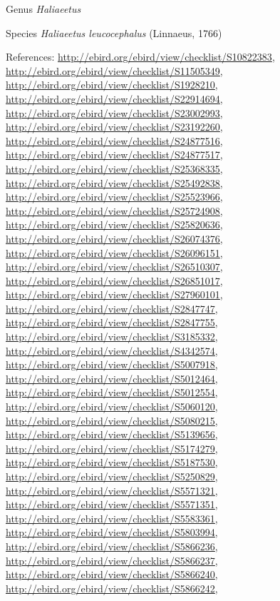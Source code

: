 \documentclass[9pt, article]{memoir}
\begin{document}
\begin{multicols}{2}
\vspace{6pt}\noindent\hspace{30pt}Genus \textit{Haliaeetus}


\vspace{6pt}\noindent\hspace{36pt}Species \textit{Haliaeetus leucocephalus} (Linnaeus, 1766)


\vspace{6pt}References: 
\url{http://ebird.org/ebird/view/checklist/S10822383}, 
\url{http://ebird.org/ebird/view/checklist/S11505349}, 
\url{http://ebird.org/ebird/view/checklist/S1928210}, 
\url{http://ebird.org/ebird/view/checklist/S22914694}, 
\url{http://ebird.org/ebird/view/checklist/S23002993}, 
\url{http://ebird.org/ebird/view/checklist/S23192260}, 
\url{http://ebird.org/ebird/view/checklist/S24877516}, 
\url{http://ebird.org/ebird/view/checklist/S24877517}, 
\url{http://ebird.org/ebird/view/checklist/S25368335}, 
\url{http://ebird.org/ebird/view/checklist/S25492838}, 
\url{http://ebird.org/ebird/view/checklist/S25523966}, 
\url{http://ebird.org/ebird/view/checklist/S25724908}, 
\url{http://ebird.org/ebird/view/checklist/S25820636}, 
\url{http://ebird.org/ebird/view/checklist/S26074376}, 
\url{http://ebird.org/ebird/view/checklist/S26096151}, 
\url{http://ebird.org/ebird/view/checklist/S26510307}, 
\url{http://ebird.org/ebird/view/checklist/S26851017}, 
\url{http://ebird.org/ebird/view/checklist/S27960101}, 
\url{http://ebird.org/ebird/view/checklist/S2847747}, 
\url{http://ebird.org/ebird/view/checklist/S2847755}, 
\url{http://ebird.org/ebird/view/checklist/S3185332}, 
\url{http://ebird.org/ebird/view/checklist/S4342574}, 
\url{http://ebird.org/ebird/view/checklist/S5007918}, 
\url{http://ebird.org/ebird/view/checklist/S5012464}, 
\url{http://ebird.org/ebird/view/checklist/S5012554}, 
\url{http://ebird.org/ebird/view/checklist/S5060120}, 
\url{http://ebird.org/ebird/view/checklist/S5080215}, 
\url{http://ebird.org/ebird/view/checklist/S5139656}, 
\url{http://ebird.org/ebird/view/checklist/S5174279}, 
\url{http://ebird.org/ebird/view/checklist/S5187530}, 
\url{http://ebird.org/ebird/view/checklist/S5250829}, 
\url{http://ebird.org/ebird/view/checklist/S5571321}, 
\url{http://ebird.org/ebird/view/checklist/S5571351}, 
\url{http://ebird.org/ebird/view/checklist/S5583361}, 
\url{http://ebird.org/ebird/view/checklist/S5803994}, 
\url{http://ebird.org/ebird/view/checklist/S5866236}, 
\url{http://ebird.org/ebird/view/checklist/S5866237}, 
\url{http://ebird.org/ebird/view/checklist/S5866240}, 
\url{http://ebird.org/ebird/view/checklist/S5866242}, 

\end{multicols}
\end{document}
